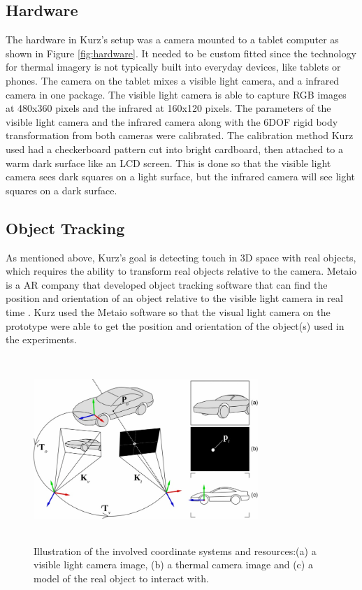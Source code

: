 \documentclass{sig-alternate}
\begin{document}
\subsection{Hardware}
\label{Hardware}
The hardware in Kurz's \cite{Thermal} setup was a camera mounted to a tablet computer as shown in Figure \ref{fig:hardware}. It needed to be custom fitted since the technology for thermal imagery is not typically built into everyday devices, like tablets or phones. The camera on the tablet mixes a visible light camera, and a infrared camera in one package. The visible light camera is able to capture RGB images at 480x360 pixels and the infrared at 160x120 pixels. The parameters of the visible light camera and the infrared camera along with the 6DOF rigid body transformation from both cameras were calibrated. The calibration method Kurz used had a checkerboard pattern cut into bright cardboard, then attached to a warm dark surface like an LCD screen. This is done so that the visible light camera sees dark squares on a light surface, but the infrared camera will see light squares on a dark surface. 


\subsection{Object Tracking}
\label{Object Tracking}
As mentioned above,  Kurz's goal is detecting touch in 3D space with real objects, which requires the ability to transform real objects relative to the camera. Metaio is a AR company that developed object tracking software that can find the position and orientation of an object relative to the visible light camera in real time \cite{Thermal}. Kurz used the Metaio software so that the visual light camera on the prototype were able to get the position and orientation of the object(s) used in the experiments.     

\begin{figure}
	\includegraphics[width=8.5cm, height=7cm]{Tracking}
	\caption{Illustration of the involved coordinate systems and resources:(a) a visible light camera image, (b) a thermal camera image and (c) a model of the real object to interact with.\cite{Thermal}}
	\label{fig:Tracking}
\end{figure}
\end{document}
